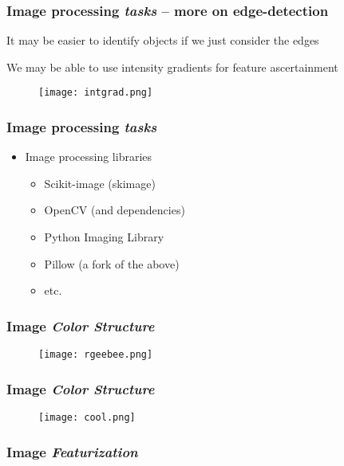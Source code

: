 \documentclass[xcolor={dvipsnames}]{beamer}
\begin{document}
\frame
{
 \frametitle{Image processing \emph{tasks} -- more on edge-detection}

It may be easier to identify objects if we just consider the edges


\begin{figure}
\centering
{} 
\end{figure}

We may be able to use intensity gradients for feature ascertainment

\begin{figure}
\centering
\texttt{[image: intgrad.png]}
\end{figure}

}




\frame
{
 \frametitle{Image processing \emph{tasks}}

\begin{itemize}
\item Image processing libraries 
 \begin{itemize}
\item Scikit-image (skimage)
\item OpenCV (and dependencies) 
\item Python Imaging Library
\item Pillow (a fork of the above)
\item etc. 
 \end{itemize}
\end{itemize} 
}




\frame
{
 \frametitle{Image \emph{Color Structure}}
 
\begin{figure}
\centering
\texttt{[image: rgeebee.png]}
\end{figure}
}

\frame
{
 \frametitle{Image \emph{Color Structure}}
 
\begin{figure}
\centering
\texttt{[image: cool.png]}
\end{figure}
}


\frame
{
 \frametitle{Image \emph{Featurization}}

\begin{figure}
\centering
{}
\end{figure}

}
\end{document}
